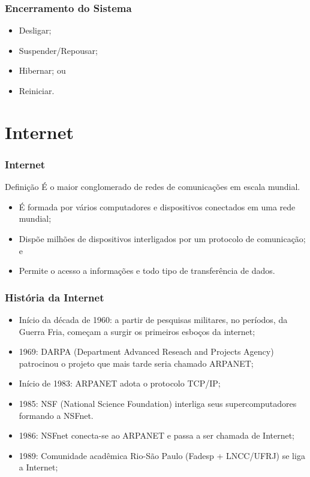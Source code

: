 \documentclass[aspectratio=169]{beamer} %
\begin{document}
\begin{frame}
	\frametitle{Encerramento do Sistema}
		
	\begin{itemize}
		\item Desligar;
		\item Suspender/Repousar;
		\item Hibernar; ou
		\item Reiniciar.
	\end{itemize}
\end{frame}

\section{Internet}

\begin{frame}
	\frametitle{Internet}
		
	\begin{block}{Defini\c cão}
		É o maior conglomerado de redes de comunicações em escala mundial.
	\end{block} \vfill
	
	\begin{itemize}
		\item É formada por vários computadores e dispositivos conectados em uma rede mundial;
		\item Dispõe milhões de dispositivos interligados por um protocolo de comunicação; e
		\item Permite o acesso a informações e todo tipo de transferência de dados.
	\end{itemize}
\end{frame}

\begin{frame}
	\frametitle{História da Internet}
			
	\begin{itemize}
		\item Início da década de 1960: a partir de pesquisas militares, no períodos, da Guerra Fria, começam a surgir os primeiros esboços da internet;
		\item 1969: DARPA (Department Advanced Reseach and Projects Agency) patrocinou o projeto que mais tarde seria chamado ARPANET;
		\item Início de 1983: ARPANET adota o protocolo TCP/IP;
		\item 1985: NSF (National Science Foundation) interliga seus supercomputadores formando a NSFnet.
		\item 1986: NSFnet conecta-se ao ARPANET e passa a ser chamada de Internet;
		\item 1989: Comunidade acadêmica Rio-São Paulo (Fadesp + LNCC/UFRJ) se liga a Internet;
	\end{itemize}
\end{frame}
\end{document}
